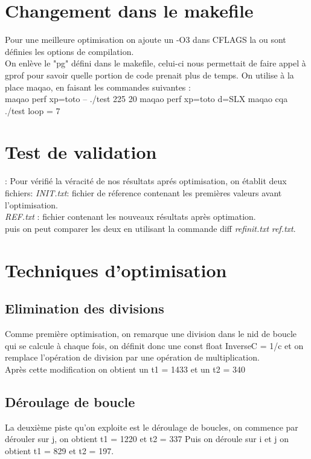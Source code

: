 \documentclass[a4paper, 10pt]{article}
\begin{document}
\section{Changement dans le makefile}
Pour une meilleure optimisation on ajoute un -O3  dans CFLAGS la ou sont d\'efinies les options de compilation.\\  
On enl\`eve le "pg" d\'efini dans le makefile, celui-ci nous permettait de faire appel \`a gprof pour savoir quelle portion de code prenait plus de temps. On utilise \`a la place maqao, en faisant les commandes suivantes : \\
  maqao perf xp=toto -- ./test 225 20
  maqao perf xp=toto d=SLX 
  maqao cqa ./test loop = 7	


\section{Test de validation}:
Pour v\'erifi\'e la v\'eracit\'e de nos r\'esultats apr\'es optimisation, on \'etablit deux fichiers:
{\it INIT.txt}: fichier de r\'eference contenant les premi\`eres valeurs avant l'optimisation.\\
{\it REF.txt} : fichier contenant les nouveaux r\'esultats apr\`es optimation.\\

puis on peut comparer les deux en utilisant la commande diff {\it refinit.txt} {\it ref.txt}. 


\section{Techniques d'optimisation}    

\subsection{Elimination des divisions}
Comme premi\`ere optimisation, on remarque une division dans le nid de boucle qui se calcule \`a chaque fois, on d\'efinit donc une 
const float InverseC = 1/c et on remplace l'op\'eration de  division par une op\'eration de multiplication.\\
 
Apr\`es cette modification on obtient un t1 = 1433 et un t2 = 340

\subsection{D\'eroulage de boucle}


La deuxi\`eme piste qu'on exploite est le d\'eroulage de boucles, on commence par d\'erouler sur j, on obtient t1 = 1220 et t2 = 337
Puis on d\'eroule sur i et j on obtient t1 = 829 et t2 = 197.
\end{document}
